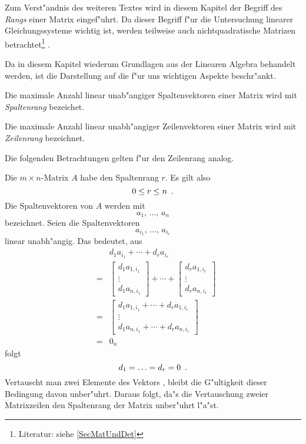 
\label{SecRang}

Zum Verst"andnis des weiteren Textes wird in diesem Kapitel der
Begriff des {\em Rangs} einer Matrix eingef"uhrt. Da dieser Begriff
f"ur die Untersuchung linearer Gleichungssysteme wichtig ist, werden
teilweise auch nichtquadratische Matrizen betrachtet\footnote{ Literatur: 
siehe \ref{SecMatUndDet} } . 

Da in diesem Kapitel 
wiederum Grundlagen aus der Linearen Algebra behandelt werden, ist
die Darstellung auf die f"ur uns wichtigen Aspekte beschr"ankt.

\MyBeginDef
    Die maximale Anzahl linear unab"angiger Spaltenvektoren einer Matrix
    wird mit {\em Spaltenrang}  bezeichet.
    
    Die maximale Anzahl linear unabh"angiger Zeilenvektoren einer Matrix
    wird mit {\em Zeilenrang}  bezeichnet.
\MyEndDef

Die folgenden Betrachtungen gelten f"ur den Zeilenrang analog.

Die $m \times n$-Matrix $A$ habe den Spaltenrang $r$. Es gilt also
\[ 0 \leq r \leq n \mbox{\hspace{0.5em}.} \] Die Spaltenvektoren von $A$ werden mit
\[ a_1, \, \ldots , \, a_n \] bezeichnet. Seien die Spaltenvektoren
\[a_{i_1}, \, \ldots, \, a_{i_r}\] linear unabh"angig. Das bedeutet, aus
\begin{eqnarray}
  & & d_1 a_{i_1} + \cdots + d_r a_{i_r} \nonumber \\
  & = & \left[
            \begin{array}{c}
                d_1 a_{1,{i_1}} \\ \vdots \\ d_1 a_{n,{i_1}}
            \end{array}
        \right]
        + \cdots +
        \left[
            \begin{array}{c}
                d_r a_{1,{i_r}} \\ \vdots \\ d_r a_{n,{i_r}}
            \end{array}
        \right]
        \nonumber \\
  & = & \left[
             \begin{array}{c}
                 d_1 a_{1,{i_1}} + \cdots + d_r a_{1,{i_r}} \\
                 \vdots \\
                 d_1 a_{n,{i_1}} + \cdots + d_r a_{n,{i_r}}
             \end{array}
        \right] \label{EquRangZeilentausch} \\
  & = & 0_n \nonumber
\end{eqnarray}
folgt
\[ d_1 = \ldots = d_r = 0 \mbox{\hspace{0.5em}.} \]
Vertauscht man zwei Elemente des Vektors ,
bleibt die G"ultigkeit dieser Bedingung davon unber"uhrt.
Daraus folgt, da"s die Vertauschung zweier Matrixzeilen den Spaltenrang
der Matrix unber"uhrt l"a"st. 

